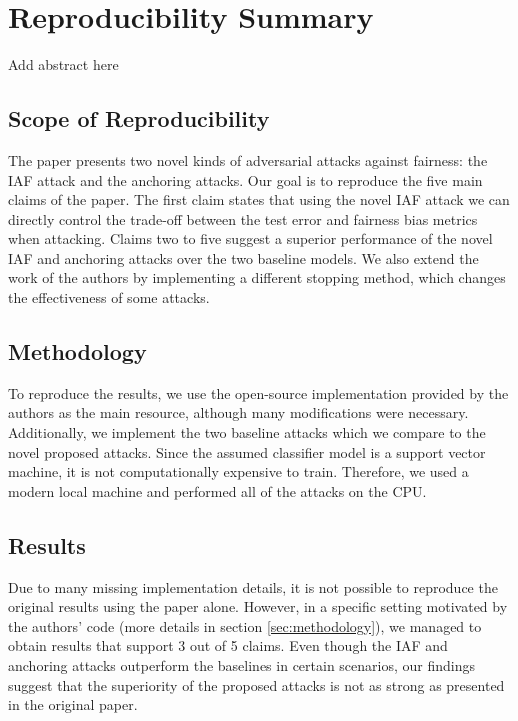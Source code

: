 \section*{\centering Reproducibility Summary}

Add abstract here

\subsection*{Scope of Reproducibility}

The paper presents two novel kinds of adversarial attacks against fairness: the IAF attack and the anchoring attacks. Our goal is to reproduce the five main claims of the paper. The first claim states that using the novel IAF attack we can directly control the trade-off between the test error and fairness bias metrics when attacking. Claims two to five suggest a superior performance of the novel IAF and anchoring attacks over the two baseline models. We also extend the work of the authors by implementing a different stopping method, which changes the effectiveness of some attacks. 

\subsection*{Methodology}

To reproduce the results, we use the open-source implementation provided by the authors as the main resource, although many modifications were necessary. Additionally, we implement the two baseline attacks which we compare to the novel proposed attacks. Since the assumed classifier model is a support vector machine, it is not computationally expensive to train. Therefore, we used a modern local machine and performed all of the attacks on the CPU. 

\subsection*{Results}

Due to many missing implementation details, it is not possible to reproduce the original results using the paper alone. However, in a specific setting motivated by the authors' code (more details in section \ref{sec:methodology}), we managed to obtain results that support 3 out of 5 claims. Even though the IAF and anchoring attacks outperform the baselines in certain scenarios, our findings suggest that the superiority of the proposed attacks is not as strong as presented in the original paper. 

